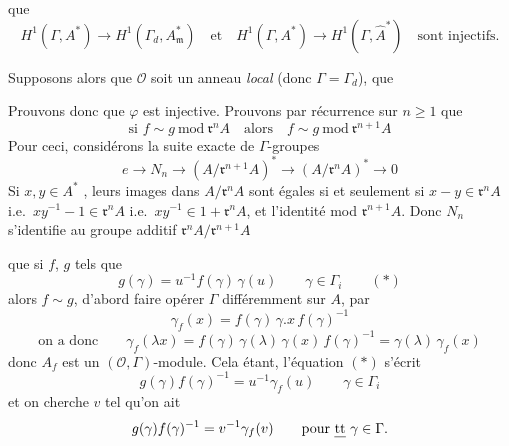 \documentclass[11pt,a4paper]{article}
\begin{document}
 que
\[
  H^1(\Gamma, A^{*}) \to H^1(\Gamma_d, A_{\mathfrak{m}}^{*})
  \quad\text{et}\quad
  H^1(\Gamma, A^{*}) \to H^1(\Gamma, \hat{A}^{*})
  \quad\text{sont injectifs.}
\]

Supposons alors que $\mathcal{O}$ soit un anneau \emph{local} (donc
$\Gamma = \Gamma_d$),  \ill{} que





 Prouvons donc que $\varphi$ est injective. Prouvons
par récurrence sur $n \geq 1$ que
\[
  \text{si } f \sim g \ \mathrm{mod}\ \mathfrak{r}^n A
  \quad \text{alors} \quad f \sim g \ \mathrm{mod}\ \mathfrak{r}^{n+1} A
\]
Pour ceci, considérons la suite exacte de $\Gamma$-groupes
\[
  e \longrightarrow N_n \longrightarrow (A/\mathfrak{r}^{n+1}A)^{*}
  \longrightarrow (A/\mathfrak{r}^{n}A)^{*} \longrightarrow 0
\]
Si $x, y \in A^{*}$ \struck{\ill{}}, leurs images dans $A/\mathfrak{r}^n A$
sont égales si et seulement si $x - y \in \mathfrak{r}^{n}A$ i.e.\
$xy^{-1} - 1 \in \mathfrak{r}^{n}A$ \struck{\ill{} \ill{}} i.e.\
$xy^{-1} \in 1 + \mathfrak{r}^{n}A$, et  l'identité
\struck{\ill{}} mod $\mathfrak{r}^{n+1}A$. Donc $N_n$ s'identifie au groupe
additif $\mathfrak{r}^n A / \mathfrak{r}^{n+1} A$

 que si
$f$, $g$  tels que
\[
  g(\gamma) = u^{-1} f(\gamma)\,\gamma(u) \qquad \gamma \in \Gamma_i
  \qquad (*)
\]
alors $f \sim g$,   d'abord faire opérer $\Gamma$
différemment sur $A$, par
\[
  \gamma_f(x) = f(\gamma)\,\gamma.x\, f(\gamma)^{-1}
\]
\[
  \text{on a donc} \qquad
  \gamma_f(\lambda x) = f(\gamma)\,\gamma(\lambda)\,\gamma(x)\,f(\gamma)^{-1}
  = \gamma(\lambda)\,\gamma_f(x)
\]
donc $A_f$ est un $(\mathcal{O}, \Gamma)$-module. \struck{\ill{}} Cela étant,
l'équation $(*)$ s'écrit
\[
  g(\gamma) f(\gamma)^{-1} = u^{-1} \gamma_f(u) \qquad \gamma \in \Gamma_i
\]
et on cherche $v$ tel qu'on ait
\[
  g(\gamma) f(\gamma)^{-1} = v^{-1} \gamma_f(v) \qquad
  \text{pour \emph{tt} } \gamma \in \Gamma .
\]
\end{document}
